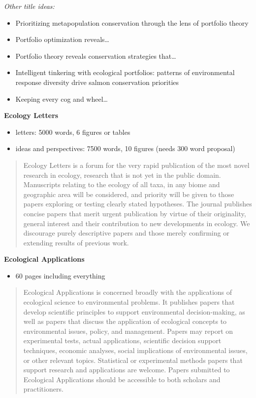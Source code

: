 \emph{Other title ideas:}

\begin{itemize}
\item
  Prioritizing metapopulation conservation through the lens of portfolio
  theory
\item
  Portfolio optimization reveals\ldots{}
\item
  Portfolio theory reveals conservation strategies that\ldots{}
\item
  Intelligent tinkering with ecological portfolios: patterns of
  environmental response diversity drive salmon conservation priorities
\item
  Keeping every cog and wheel\ldots{}
\end{itemize}

\textbf{Ecology Letters}

\begin{itemize}
\itemsep1pt\parskip0pt
\item
  letters: 5000 words, 6 figures or tables
\item
  ideas and perspectives: 7500 words, 10 figures (needs 300 word
  proposal)
\end{itemize}

\begin{quote}
Ecology Letters is a forum for the very rapid publication of the most
novel research in ecology, research that is not yet in the public
domain. Manuscripts relating to the ecology of all taxa, in any biome
and geographic area will be considered, and priority will be given to
those papers exploring or testing clearly stated hypotheses. The journal
publishes concise papers that merit urgent publication by virtue of
their originality, general interest and their contribution to new
developments in ecology. We discourage purely descriptive papers and
those merely confirming or extending results of previous work.
\end{quote}

\textbf{Ecological Applications}

\begin{itemize}
\itemsep1pt\parskip0pt
\item
  60 pages including everything
\end{itemize}

\begin{quote}
Ecological Applications is concerned broadly with the applications of
ecological science to environmental problems. It publishes papers that
develop scientific principles to support environmental decision-making,
as well as papers that discuss the application of ecological concepts to
environmental issues, policy, and management. Papers may report on
experimental tests, actual applications, scientific decision support
techniques, economic analyses, social implications of environmental
issues, or other relevant topics. Statistical or experimental methods
papers that support research and applications are welcome. Papers
submitted to Ecological Applications should be accessible to both
scholars and practitioners.
\end{quote}

